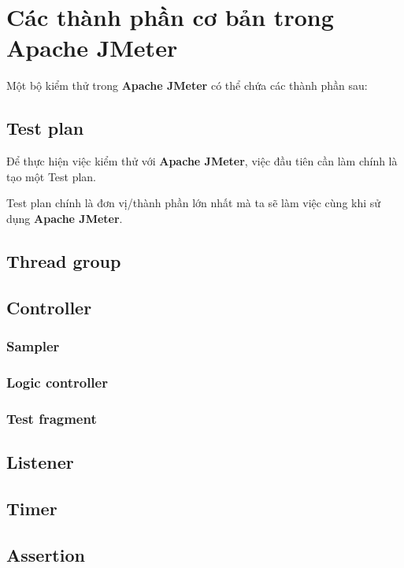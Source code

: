\documentclass[10pt]{report}
\newcommand{\jmeter}{\textbf{Apache JMeter}}
\begin{document}
\chapter{Các thành phần cơ bản trong Apache JMeter}

\par Một bộ kiểm thử trong \jmeter{} có thể chứa các thành phần sau:
\section{Test plan}

\par Để thực hiện việc kiểm thử với \jmeter{}, việc đầu tiên cần làm chính là tạo một Test plan.

\par Test plan chính là đơn vị/thành phần lớn nhất mà ta sẽ làm việc cùng khi sử dụng \jmeter{}.

\section{Thread group}

\section{Controller}

\subsection{Sampler}
\subsection{Logic controller}
\subsection{Test fragment}

\section{Listener}

\section{Timer}

\section{Assertion}
\end{document}
